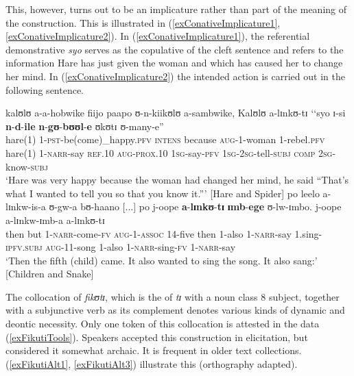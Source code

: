 This, however, turns out to be an implicature rather than part of the meaning of the construction. This is illustrated in (\ref{exConativeImplicature1}, \ref{exConativeImplicature2}). In (\ref{exConativeImplicature1}), the referential demonstrative \textit{syo} serves as the copulative of the cleft sentence and refers to the information Hare has just given the woman and which has caused her to change her mind. In (\ref{exConativeImplicature2}) the intended action is carried out in the following sentence.
\begin{exe}
\ex \label{exConativeImplicature1} \gll kalʊlʊ a-a-hobwike fiijo paapo ʊ-n-kiikʊlʊ a-sambwike, Kalʊlʊ a-lɪnkʊ-tɪ \textup{\lq\lq}syo ɪ-si \textbf{n}-\textbf{d}-\textbf{ile} \textbf{n}-\textbf{gʊ}-\textbf{bʊʊl}-\textbf{e} ʊkʊtɪ ʊ-many-e\textup{”}\\
hare(1) 1-\textsc{pst}-be(come)\_happy.\textsc{pfv} \textsc{intens} because \textsc{aug}-1-woman 1-rebel.\textsc{pfv} hare(1) 1-\textsc{narr}-say \phantom{\lq\lq}\textsc{ref.10} \textsc{aug}-\textsc{prox.10} \textsc{1sg}-say-\textsc{pfv} \textsc{1sg}-\textsc{2sg}-tell-\textsc{subj} \textsc{comp} \textsc{2sg}-know-\textsc{subj} \\
\glt `Hare was very happy because the woman had changed her mind, he said ``That's what I wanted to tell you so that you know it.''{}' [Hare and Spider]
\ex \label{exConativeImplicature2} \gll po leelo a-lɪnkw-is-a ʊ-gw-a bʊ-haano [...] po j-oope \textbf{a}-\textbf{lɪnkʊ}-\textbf{tɪ} \textbf{ɪmb}-\textbf{ege} ʊ-lw-ɪmbo. j-oope a-lɪnkw-ɪmb-a a-lɪnkʊ-tɪ\\
then but 1-\textsc{narr}-come-\textsc{fv} \textsc{aug}-1-\textsc{assoc} 14-five {} then 1-also 1-\textsc{narr}-say 1.sing-\textsc{ipfv.subj} \textsc{aug}-11-song 1-also 1-\textsc{narr}-sing-\textsc{fv} 1-\textsc{narr}-say\\
\glt \lq Then the fifth (child) came. It also wanted to sing the song. It also sang:' [Children and Snake]
\end{exe}
The collocation of \textit{fikʊtɪ}, which is the  of \textit{tɪ} with a noun class 8 subject, together with a subjunctive verb as its complement denotes various kinds of dynamic and deontic necessity. Only one token of this collocation is attested in the data (\ref{exFikutiTools}). Speakers accepted this construction in elicitation, but considered it somewhat archaic. It is frequent in older text collections. (\ref{exFikutiAlt1}, \ref{exFikutiAlt3}) illustrate this (orthography adapted).


